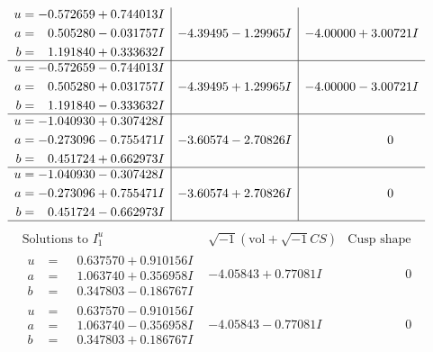 \documentclass[1p]{elsarticle_modified}
\theoremstyle{definition}
\newcommand{\I}{\sqrt{-1}}
\begin{document}
$$\begin{array}{c|c|c}
\begin{aligned}
u &= -0.572659 + 0.744013 I \\
a &= \phantom{-}0.505280 - 0.031757 I \\
b &= \phantom{-}1.191840 + 0.333632 I\end{aligned}
 & -4.39495 - 1.29965 I & -4.00000 + 3.00721 I \\ \hline\begin{aligned}
u &= -0.572659 - 0.744013 I \\
a &= \phantom{-}0.505280 + 0.031757 I \\
b &= \phantom{-}1.191840 - 0.333632 I\end{aligned}
 & -4.39495 + 1.29965 I & -4.00000 - 3.00721 I \\ \hline\begin{aligned}
u &= -1.040930 + 0.307428 I \\
a &= -0.273096 - 0.755471 I \\
b &= \phantom{-}0.451724 + 0.662973 I\end{aligned}
 & -3.60574 - 2.70826 I & \phantom{-0.000000 } 0 \\ \hline\begin{aligned}
u &= -1.040930 - 0.307428 I \\
a &= -0.273096 + 0.755471 I \\
b &= \phantom{-}0.451724 - 0.662973 I\end{aligned}
 & -3.60574 + 2.70826 I & \phantom{-0.000000 } 0\\
 \hline 
 \end{array}$$\newpage$$\begin{array}{c|c|c}  
\text{Solutions to }I^u_{1}& \I (\text{vol} + \sqrt{-1}CS) & \text{Cusp shape}\\
 \hline 
\begin{aligned}
u &= \phantom{-}0.637570 + 0.910156 I \\
a &= \phantom{-}1.063740 + 0.356958 I \\
b &= \phantom{-}0.347803 - 0.186767 I\end{aligned}
 & -4.05843 + 0.77081 I & \phantom{-0.000000 } 0 \\ \hline\begin{aligned}
u &= \phantom{-}0.637570 - 0.910156 I \\
a &= \phantom{-}1.063740 - 0.356958 I \\
b &= \phantom{-}0.347803 + 0.186767 I\end{aligned}
 & -4.05843 - 0.77081 I & \phantom{-0.000000 } 0 \\ \hline\begin{aligned}

\end{aligned}
\end{array}$$
\end{document}
